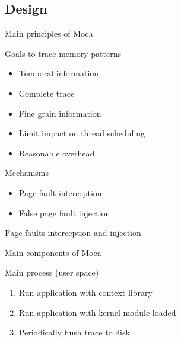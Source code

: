 \documentclass[xcolor={usenames,dvipsnames},hyperref={pdfusetitle}]{beamer}
\begin{document}
\subsection{Design}

\begin{frame}{Main principles of Moca}
    \begin{block}{Goals to trace memory patterns}
        \begin{itemize}
            \item Temporal information
            \item Complete trace
            \item Fine grain information
            \item Limit impact on thread scheduling
            \item Reasonable overhead
        \end{itemize}
    \end{block}
    \pause
    \begin{exampleblock}{Mechanisms}
        \begin{itemize}
            \item Page fault interception
            \item False page fault injection
        \end{itemize}
    \end{exampleblock}
\end{frame}

\begin{frame}{Page faults interception and injection}
    \centering
    
\end{frame}

\begin{frame}{Main components of Moca}
   \begin{block}{Main process (user space)}
       \begin{enumerate}
           \item Run application with context library
           \item Run application with kernel module loaded
           \item Periodically flush trace to disk
       \end{enumerate}
   \end{block}
\end{frame}
\end{document}
